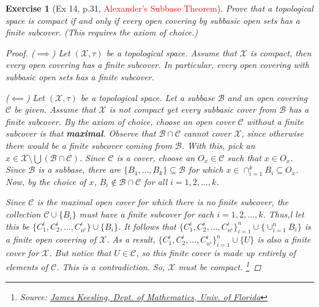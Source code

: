 \documentclass[11pt]{article}
\newtheorem{exercise}{Exercise}
\newcommand{\X}{\mathcal{X}}
\begin{document}
\begin{exercise}[Ex 14, p.31, \textcolor{red}{Alexander's Subbase Theorem}]
	Prove that a topological space is compact if and only if every open covering
	by subbasic open sets has a finite subcover. (This requires the axiom of
	choice.)

	\begin{proof}
		($\implies$) Let $(\X,\tau)$ be a topological space. Assume that $\X$ is compact, then every open covering has a finite subcover.  In particular, every open covering with subbasic open sets has a finite subcover. 
		
		($\impliedby$) Let $(\X,\tau)$ be a topological space. Let a subbase $\mathcal{B}$ and an open covering $\mathcal{C}$ be given. Assume that $\X$ is not compact yet every subbasic cover from $\mathcal{B}$ has a finite subcover. By the axiom of choice, choose an open cover $\mathcal{C}$ without a finite subcover is that \textbf{maximal}. Observe that $\mathcal{B} \cap \mathcal{C}$ cannot cover $\X$, since otherwise there would be a finite subcover coming from $\mathcal{B}$. With this, pick an $x\in \X\setminus \bigcup (\mathcal{B} \cap \mathcal{C})$. Since $\mathcal{C}$ is a cover, choose an $O_x \in \mathcal{C}$ such that $x\in O_x$. Since $\mathcal{B}$ is a subbase, there are $\{B_1,\dots, B_k \} \subseteq \mathcal{B}$ for which $x\in \cap^k_{i=1}B_i \subseteq O_x$. Now, by the choice of $x$, $B_i \notin \mathcal{B}\cap \mathcal{C}$ for all $i=1,2,\dots,k$. 
		
		Since $\mathcal{C}$ is the maximal open cover for which there is no finite subcover, the collection $\mathcal{C}\cup \{ B_i \}$ must have a finite subcover for each $i=1,2,\dots,k$. Thus,l let this be $\{ C_1^i, C_2^i, \dots , C_{n^i}^i\} \cup \{B_i\}$. It follows that $\{ C_1^i, C_2^i, \dots , C_{n^i}^i\}_{i=1}^n \cup \{\cup^n_{i=1} B_i\}$ is a finite open covering of $\X$. As a result, $\{ C_1^i, C_2^i, \dots , C_{n^i}^i\}_{i=1}^n \cup \{ U\}$ is also a finite cover for $\X$. But notice that $U\in \mathcal{C}$, so this finite cover is made up entirely of elements of $\mathcal{C}$. This is a contradiction. So, $\X$ must be compact. \footnote{Source: \href{https://people.clas.ufl.edu/kees/files/AlexanderTychonoff.pdf}{James Keesling, Dept. of Mathematics, Univ. of Florida}}
	\end{proof}
\end{exercise}
\end{document}
